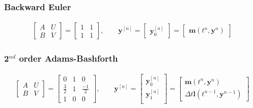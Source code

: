 \subsubsection{Backward Euler}
\begin{align*}
\left[\begin{array}{c|c}
A & U \\
\hline
 B & V
\end{array}\right] =
\left[\begin{array}{c|c}
1 & 1 \\
\hline
1 & 1
\end{array}\right],\qquad
\boldsymbol{y}^{[n]}=
\left[\begin{array}{c}
\boldsymbol{y}^{[n]}_0
\end{array}\right]=
\left[\begin{array}{c}
\boldsymbol{m}\left(t^n,\boldsymbol{y}^{n}\right)
\end{array}\right]
\end{align*}

\subsubsection{2$^{nd}$ order Adams-Bashforth}
\begin{align*}
\left[\begin{array}{c|c}
A & U \\
\hline
B & V
\end{array}\right] =
\left[\begin{array}{c|cc}
0 & 1 & 0 \\
\hline
\frac{3}{2} & 1 & \frac{-1}{2}  \\
1 & 0 & 0
\end{array}\right],\qquad
\boldsymbol{y}^{[n]}=
\left[\begin{array}{c}
\boldsymbol{y}^{[n]}_0\\
\boldsymbol{y}^{[n]}_1\\
\end{array}\right]=
\left[\begin{array}{c}
\boldsymbol{m}\left(t^n,\boldsymbol{y}^{n}\right)\\
\Delta t \boldsymbol{l}(t^{n-1},\boldsymbol{y}^{n-1})
\end{array}\right]
\end{align*}

